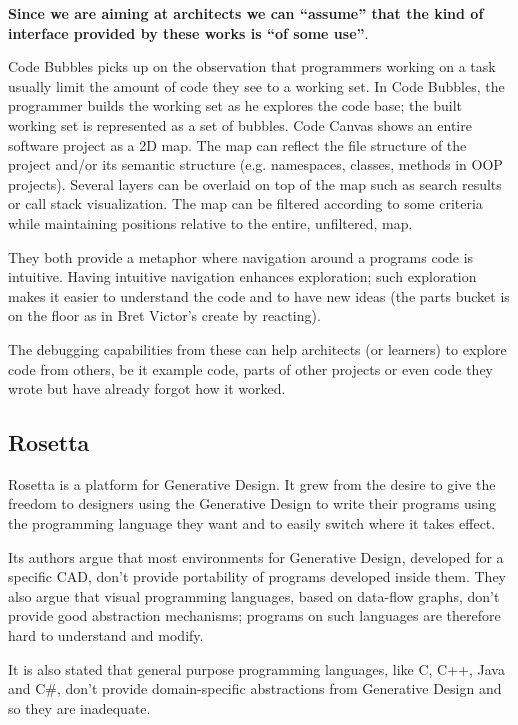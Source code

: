 \documentclass{./llncs2e/llncs}
\begin{document}
	\textbf{Since we are aiming at architects we can ``assume'' that the kind of interface provided by these works is ``of some use''}.

	Code Bubbles picks up on the observation that programmers working on a task usually limit the amount of code they see to a working set. 
	In Code Bubbles, the programmer builds the working set as he explores the code base; the built working set is represented as a set of bubbles.
	Code Canvas shows an entire software project as a 2D map.
	The map can reflect the file structure of the project and/or its semantic structure (e.g. namespaces, classes, methods in OOP projects). Several layers can be overlaid on top of the map such as search results or call stack visualization. The map can be filtered according to some criteria while maintaining positions relative to the entire, unfiltered, map.

	They both provide a metaphor where navigation around a programs code is intuitive. 
	Having intuitive navigation enhances exploration; such exploration makes it easier to understand the code and to have new ideas (the parts bucket is on the floor as in Bret Victor's create by reacting).

	The debugging capabilities from these can help architects (or learners) to explore code from others, be it example code, parts of other projects or even code they wrote but have already forgot how it worked.


\subsection{Rosetta}
	Rosetta is a platform for Generative Design.
	It grew from the desire to give the freedom to designers using the Generative Design to write their programs using the programming language they want and to easily switch where it takes effect.

	Its authors argue that most environments for Generative Design, developed for a specific CAD, don't provide portability of programs developed inside them.
	They also argue that visual programming languages, based on data-flow graphs, don't provide good abstraction mechanisms; programs on such languages are therefore hard to understand and modify.

	It is also stated that general purpose programming languages, like C, C++, Java and C\#, don't provide domain-specific abstractions from Generative Design and so they are inadequate.
\end{document}
